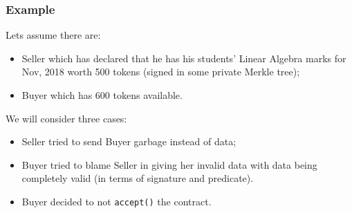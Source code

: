 \subsubsection{Example}

Lets assume there are:
\begin{itemize}
  \item Seller which has declared that he has his students' Linear Algebra marks for Nov, 2018 worth 500 tokens (signed in some private Merkle tree);
  \item Buyer which has 600 tokens available.
\end{itemize}

We will consider three cases:
\begin{itemize}
  \item Seller tried to send Buyer garbage instead of data;
  \item Buyer tried to blame Seller in giving her invalid data with data being completely valid (in terms of signature and predicate).
  \item Buyer decided to not \verb|accept()| the contract.
\end{itemize}

